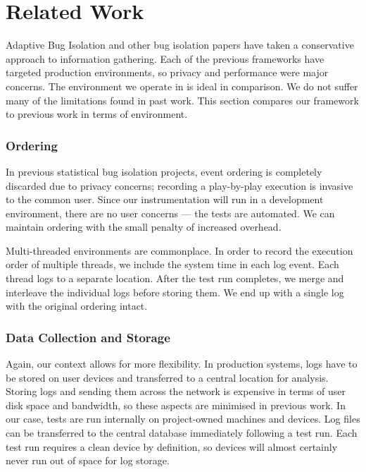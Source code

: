 \section{Related Work}
\label{sec:relwork}

Adaptive Bug Isolation \cite{ArumugaNainar:2010:ABI:1806799.1806839} and other
bug isolation papers have taken a conservative approach to information
gathering. Each of the previous frameworks have targeted production
environments, so privacy and performance were major concerns. The environment
we operate in is ideal in comparison. We do not suffer many of the limitations
found in past work. This section compares our framework to previous work in
terms of environment.

\subsubsection{Ordering}

In previous statistical bug isolation projects, event ordering is completely
discarded due to privacy concerns; recording a play-by-play execution is
invasive to the common user. Since our instrumentation will run in a development
environment, there are no user concerns --- the tests are automated. We can
maintain ordering with the small penalty of increased overhead.

Multi-threaded environments are commonplace. In order to record the execution
order of multiple threads, we include the system time in each log event. Each
thread logs to a separate location. After the test run completes, we merge and
interleave the individual logs before storing them. We end up with a single log
with the original ordering intact.

\subsubsection{Data Collection and Storage}

Again, our context allows for more flexibility. In production systems, logs have
to be stored on user devices and transferred to a central location for analysis.
Storing logs and sending them across the network is expensive in terms of user
disk space and bandwidth, so these aspects are minimised in previous work. In
our case, tests are run internally on project-owned machines and devices. Log
files can be transferred to the central database immediately following a test
run. Each test run requires a clean device by definition, so devices will almost
certainly never run out of space for log storage.


